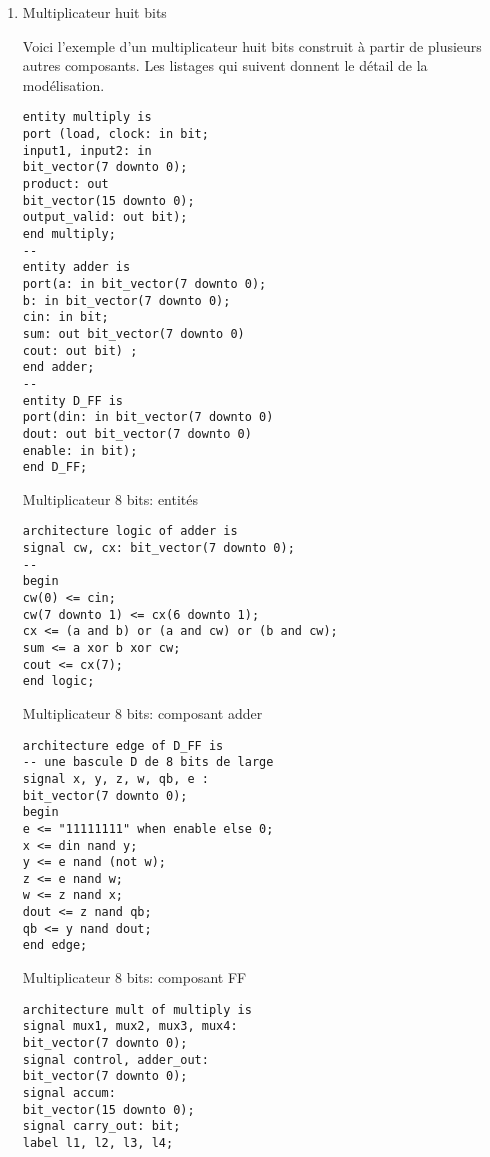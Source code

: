 \documentclass[letter, oneside]{book}
\begin{document}
\begin{enumerate}
\item Multiplicateur huit bits
\label{sec:orgc768e38}

Voici l'exemple d'un multiplicateur huit bits construit à partir de
plusieurs autres composants.  Les listages qui suivent donnent le
détail de la modélisation.

\begin{listing}[htbp]
\begin{verbatim}
entity multiply is
port (load, clock: in bit;
input1, input2: in
bit_vector(7 downto 0);
product: out
bit_vector(15 downto 0);
output_valid: out bit);
end multiply;
--
entity adder is
port(a: in bit_vector(7 downto 0);
b: in bit_vector(7 downto 0);
cin: in bit;
sum: out bit_vector(7 downto 0)
cout: out bit) ;
end adder;
--
entity D_FF is
port(din: in bit_vector(7 downto 0)
dout: out bit_vector(7 downto 0)
enable: in bit);
end D_FF;
\end{verbatim}
\caption{Multiplicateur 8 bits: entités}
\end{listing}

\begin{listing}[htbp]
\begin{verbatim}
architecture logic of adder is
signal cw, cx: bit_vector(7 downto 0);
--
begin
cw(0) <= cin;
cw(7 downto 1) <= cx(6 downto 1);
cx <= (a and b) or (a and cw) or (b and cw);
sum <= a xor b xor cw;
cout <= cx(7);
end logic;
\end{verbatim}
\caption{Multiplicateur 8 bits: composant adder}
\end{listing}

\begin{listing}[htbp]
\begin{verbatim}
architecture edge of D_FF is
-- une bascule D de 8 bits de large
signal x, y, z, w, qb, e :
bit_vector(7 downto 0);
begin
e <= "11111111" when enable else 0;
x <= din nand y;
y <= e nand (not w);
z <= e nand w;
w <= z nand x;
dout <= z nand qb;
qb <= y nand dout;
end edge;
\end{verbatim}
\caption{Multiplicateur 8 bits: composant FF}
\end{listing}


\begin{listing}[htbp]
\begin{verbatim}
architecture mult of multiply is
signal mux1, mux2, mux3, mux4:
bit_vector(7 downto 0);
signal control, adder_out:
bit_vector(7 downto 0);
signal accum:
bit_vector(15 downto 0);
signal carry_out: bit;
label l1, l2, l3, l4;


\end{verbatim}
\end{listing}
\end{enumerate}
\end{document}
